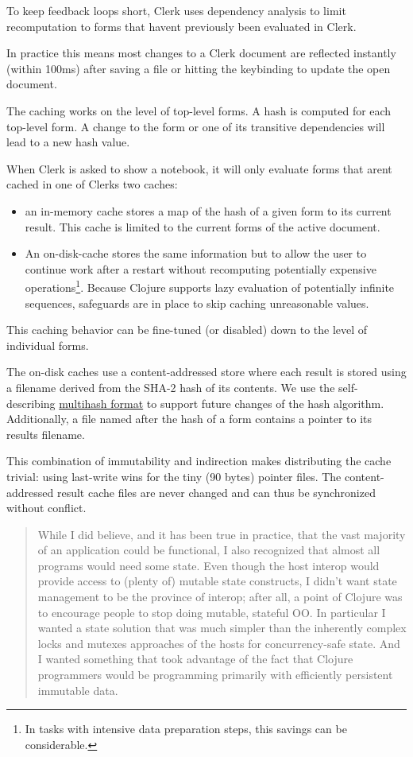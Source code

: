 \documentclass[sigconf,screen]{acmart}
\providecommand{\tightlist}{%
  \setlength{\itemsep}{0pt}\setlength{\parskip}{0pt}}
\begin{document}
To keep feedback loops short, Clerk uses dependency analysis to limit recomputation to forms that haven\textquotesingle t previously been evaluated in Clerk.

In practice this means most changes to a Clerk document are reflected instantly (within 100ms) after saving a file or hitting the keybinding to update the open document.

The caching works on the level of top-level forms. A hash is computed for each top-level form. A change to the form or one of its transitive dependencies will lead to a new hash value.

When Clerk is asked to show a notebook, it will only evaluate forms that aren\textquotesingle t cached in one of Clerk\textquotesingle s two caches:

\begin{itemize}
\tightlist
\item
  an in-memory cache stores a map of the hash of a given form to its current result. This cache is limited to the current forms of the active document.
\item
  An on-disk-cache stores the same information but to allow the user to continue work after a restart without recomputing potentially expensive operations\footnote{In tasks with intensive data preparation steps, this savings can be considerable.}. Because Clojure supports lazy evaluation of potentially infinite sequences, safeguards are in place to skip caching unreasonable values.
\end{itemize}

This caching behavior can be fine-tuned (or disabled) down to the level of individual forms.

The on-disk caches use a content-addressed store where each result is stored using a filename derived from the SHA-2 hash of its contents. We use the self-describing \href{https://multiformats.io/multihash/}{multihash format} to support future changes of the hash algorithm. Additionally, a file named after the hash of a form contains a pointer to its results filename.

This combination of immutability and indirection makes distributing the cache trivial: using last-write wins for the tiny (90 bytes) pointer files. The content-addressed result cache files are never changed and can thus be synchronized without conflict.

\begin{quote}
While I did believe, and it has been true in practice, that the vast majority of an application could be functional, I also recognized that almost all programs would need some state. Even though the host interop would provide access to (plenty of) mutable state constructs, I didn't want state management to be the province of interop; after all, a point of Clojure was to encourage people to stop doing mutable, stateful OO. In particular I wanted a state solution that was much simpler than the inherently complex locks and mutexes approaches of the hosts for concurrency-safe state. And I wanted something that took advantage of the fact that Clojure programmers would be programming primarily with efficiently persistent immutable data. \cite{Hickey_2020}
\end{quote}
\end{document}
